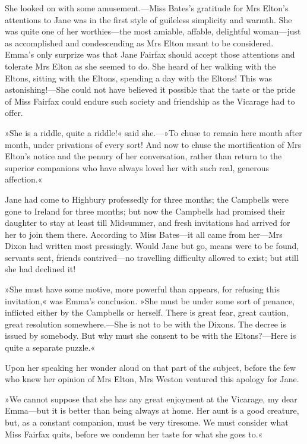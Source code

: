 She looked on with some amusement.—Miss Bates's gratitude for Mrs Elton's attentions to Jane was in the first style of guileless simplicity and warmth. She was quite one of her worthies—the most amiable, affable, delightful woman—just as accomplished and condescending as Mrs Elton meant to be considered. Emma's only surprize was that Jane Fairfax should accept those attentions and tolerate Mrs Elton as she seemed to do. She heard of her walking with the Eltons, sitting with the Eltons, spending a day with the Eltons! This was astonishing!—She could not have believed it possible that the taste or the pride of Miss Fairfax could endure such society and friendship as the Vicarage had to offer.

»She is a riddle, quite a riddle!« said she.—»To chuse to remain here month after month, under privations of every sort! And now to chuse the mortification of Mrs Elton's notice and the penury of her conversation, rather than return to the superior companions who have always loved her with such real, generous affection.«

Jane had come to Highbury professedly for three months; the Campbells were gone to Ireland for three months; but now the Campbells had promised their daughter to stay at least till Midsummer, and fresh invitations had arrived for her to join them there. According to Miss Bates—it all came from her—Mrs Dixon had written most pressingly. Would Jane but go, means were to be found, servants sent, friends contrived—no travelling difficulty allowed to exist; but still she had declined it!

»She must have some motive, more powerful than appears, for refusing this invitation,« was Emma's conclusion. »She must be under some sort of penance, inflicted either by the Campbells or herself. There is great fear, great caution, great resolution somewhere.—She is not to be with the Dixons. The decree is issued by somebody. But why must she consent to be with the Eltons?—Here is quite a separate puzzle.«

Upon her speaking her wonder aloud on that part of the subject, before the few who knew her opinion of Mrs Elton, Mrs Weston ventured this apology for Jane.

»We cannot suppose that she has any great enjoyment at the Vicarage, my dear Emma—but it is better than being always at home. Her aunt is a good creature, but, as a constant companion, must be very tiresome. We must consider what Miss Fairfax quits, before we condemn her taste for what she goes to.«

